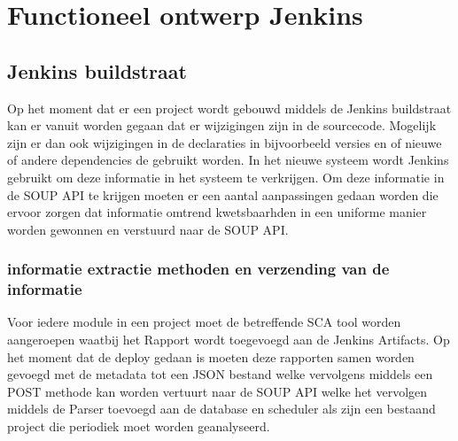 \chapter{Functioneel ontwerp Jenkins}\label{ch:impl-Jenkins}


\section{Jenkins buildstraat}\label{sec:jenkins-buildtstraat}
Op het moment dat er een project wordt gebouwd middels de Jenkins buildstraat kan er vanuit worden gegaan dat er wijzigingen zijn in de sourcecode. Mogelijk zijn er dan ook wijzigingen in de declaraties in bijvoorbeeld versies en of nieuwe of andere dependencies de gebruikt worden. In het nieuwe systeem wordt Jenkins gebruikt om deze informatie in het systeem te verkrijgen. Om deze informatie in de SOUP API te krijgen moeten er een aantal aanpassingen gedaan worden die ervoor zorgen dat informatie omtrend kwetsbaarhden in een uniforme manier worden gewonnen en verstuurd naar de SOUP API.


\subsection{informatie extractie methoden en verzending van de informatie}

Voor iedere module in een project moet de betreffende SCA tool worden aangeroepen waatbij het Rapport wordt toegevoegd aan de Jenkins Artifacts.
Op het moment dat de deploy gedaan is moeten deze rapporten samen worden gevoegd met de metadata tot een JSON bestand welke vervolgens middels een POST methode kan worden vertuurt naar de SOUP API welke het vervolgen middels de Parser toevoegd aan de database en scheduler als zijn een bestaand project die periodiek moet worden geanalyseerd.

